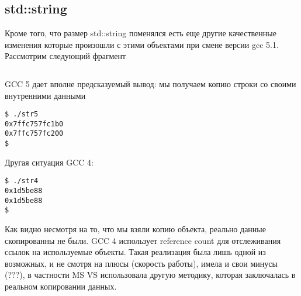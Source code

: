 \documentclass[14pt,a4paper]{article}
\begin{document}





\subsection{std::string}

Кроме того, что размер std::string поменялся есть еще другие
качественные изменения которые произошли с этими объектами при смене
версии gcc 5.1. Рассмотрим следующий фрагмент
\inputminted{c++}{./src/str.cpp}

GCC 5 дает вполне предсказуемый вывод: мы получаем копию строки со
своими внутренними данными
\begin{verbatim}
$ ./str5
0x7ffc757fc1b0
0x7ffc757fc200
$
\end{verbatim}

Другая ситуация GCC 4:
\begin{verbatim}
$ ./str4
0x1d5be88
0x1d5be88
$
\end{verbatim}

Как видно несмотря на то, что мы взяли копию объекта, реально данные
скопированны не были. GCC 4 использует reference count для
отслеживания ссылок на используемые объекты. Такая реализация была
лишь одной из возможных, и не смотря на плюсы (скорость работы), имела
и свои минусы (???), в частности MS VS использовала другую
методику, которая заключалась в реальном копировании данных.
\end{document}
